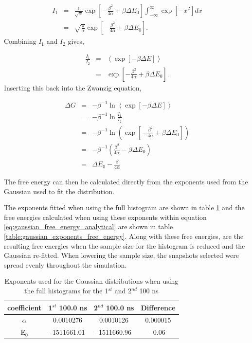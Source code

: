 \begin{eqnarray}
\ I_1 &=& \frac{1}{\sqrt{\alpha}}\exp \left[-\frac{\beta^2}{4\alpha}+ \beta \Delta E_0 \right] \int_{-\infty}^{\infty} \exp \left[ - x^2 \right] dx \\
\ &=& \sqrt{\frac{\pi}{\alpha}}\exp \left[-\frac{\beta^2}{4\alpha}+ \beta \Delta E_0 \right] .
\end{eqnarray}
%
Combining $I_1$ and $I_2$ gives,

\begin{eqnarray}
\ \frac{I_1}{I_2} &=& \left\langle \exp \left[ - \beta \Delta E \right] \right\rangle \\
&=& \exp \left[ - \frac{\beta^2}{4\alpha}+ \beta \Delta E_0 \right] .
\end{eqnarray}
%
Inserting this back into the Zwanzig equation,

\begin{eqnarray}
\ \Delta G &=& - \beta^{-1} \ln \left\langle \exp \left[ - \beta \Delta E \right] \right\rangle \\
\ &=& - \beta ^{-1} \ln \frac{I_1}{I_2} \\
\ &=& - \beta^{-1} \ln \left( \exp \left[ - \frac{\beta^2}{4\alpha}+ \beta \Delta E_0 \right] \right) \\
\ &=& - \beta^{-1} \left( \frac{\beta^2}{4\alpha}- \beta \Delta E_0  \right) \\ \label{eq:gaussian_free_energy_analytical}
\ &=& \Delta E_0 - \frac{\beta}{4 \alpha}
\end{eqnarray}

The free energy can then be calculated directly from the exponents used from the Gaussian used to fit the distribution.

The exponents fitted when using the full histogram are shown in table \ref{table:gaussian_exponents} and the free energies calculated when using these exponents within equation \ref{eq:gaussian_free_energy_analytical} are shown in table \ref{table:gaussian_exponents_free_energy}.  Along with these free energies, are the resulting free energies when the sample size for the histogram is reduced and the Gaussian re-fitted.  When lowering the sample size, the snapshots selected were spread evenly throughout the simulation.

\begin{table}[ht]
 \caption{Exponents used for the Gaussian distributions when using the full histograms for the 1$^{st}$ and 2$^{nd}$ 100 ns}
  \begin{center}
  \begin{tabular}{c|c|c|c}
   \hline\hline
 coefficient & 1$^{st}$ 100.0 ns & 2$^{nd}$ 100.0 ns & Difference \\
\hline
$\alpha$ & 0.0010276 & 0.0010126 & 0.000015 \\
\hline
E$_0$ & -1511661.01 & -1511660.96 & -0.06 \\
  \end{tabular}\label{table:gaussian_exponents}
 \end{center}
\end{table}

